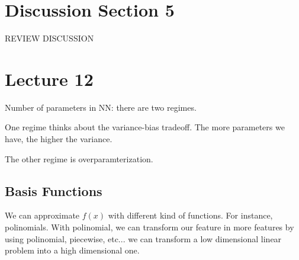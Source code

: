\documentclass{article}
\begin{document}
\section*{Discussion Section 5}

REVIEW DISCUSSION

\section{Lecture 12}

Number of parameters in NN: there are two regimes.

One regime thinks about the variance-bias tradeoff. The more parameters we have, the higher the variance.

The other regime is overparamterization. 

\subsection{Basis Functions}

We can approximate $f(x)$ with different kind of functions. For instance, polinomials. With polinomial, we can transform our feature in more features by using polinomial, piecewise, etc... we can transform a low dimensional linear problem into a high dimensional one.
\end{document}
